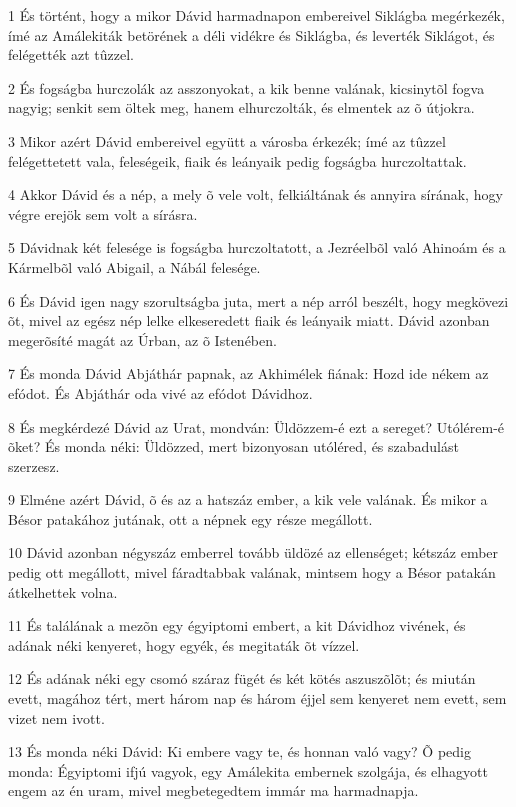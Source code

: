 \par 1 És történt, hogy a mikor Dávid harmadnapon embereivel Siklágba megérkezék, ímé az Amálekiták betörének a déli vidékre és Siklágba, és leverték Siklágot, és felégették azt tûzzel.
\par 2 És fogságba hurczolák az asszonyokat, a kik benne valának, kicsinytõl fogva nagyig; senkit sem öltek meg, hanem elhurczolták, és elmentek az õ útjokra.
\par 3 Mikor azért Dávid embereivel együtt a városba érkezék; ímé az tûzzel felégettetett vala, feleségeik, fiaik és leányaik pedig fogságba hurczoltattak.
\par 4 Akkor Dávid és a nép, a mely õ vele volt, felkiáltának és annyira sírának, hogy végre erejök sem volt a sírásra.
\par 5 Dávidnak két felesége is fogságba hurczoltatott, a Jezréelbõl való Ahinoám és a Kármelbõl való Abigail, a Nábál felesége.
\par 6 És Dávid igen nagy szorultságba juta, mert a nép arról beszélt, hogy megkövezi õt, mivel az egész nép lelke elkeseredett fiaik és leányaik miatt. Dávid azonban megerõsíté magát az Úrban, az õ Istenében.
\par 7 És monda Dávid Abjáthár papnak, az Akhimélek fiának: Hozd ide nékem az efódot. És Abjáthár oda vivé az efódot Dávidhoz.
\par 8 És megkérdezé Dávid az Urat, mondván: Üldözzem-é ezt a sereget? Utólérem-é õket? És monda néki: Üldözzed, mert bizonyosan utóléred, és szabadulást szerzesz.
\par 9 Elméne azért Dávid, õ és az a hatszáz ember, a kik vele valának. És mikor a Bésor patakához jutának, ott a népnek egy része megállott.
\par 10 Dávid azonban négyszáz emberrel tovább üldözé az ellenséget; kétszáz ember pedig ott megállott, mivel fáradtabbak valának, mintsem hogy a Bésor patakán átkelhettek volna.
\par 11 És találának a mezõn egy égyiptomi embert, a kit Dávidhoz vivének, és adának néki kenyeret, hogy egyék, és megitaták õt vízzel.
\par 12 És adának néki egy csomó száraz fügét és két kötés aszuszõlõt; és miután evett, magához tért, mert három nap és három éjjel sem kenyeret nem evett, sem vizet nem ivott.
\par 13 És monda néki Dávid: Ki embere vagy te, és honnan való vagy? Õ pedig monda: Égyiptomi ifjú vagyok, egy Amálekita embernek szolgája, és elhagyott engem az én uram, mivel megbetegedtem immár ma harmadnapja.
